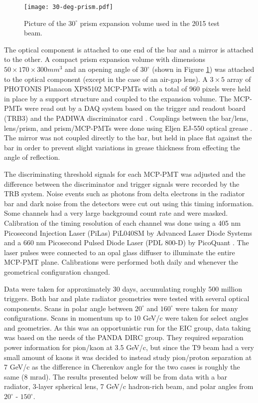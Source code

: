 \begin{figure}[!htb]
	\centering
	\texttt{[image: 30-deg-prism.pdf]}
	\caption{Picture of the $30^{\circ}$ prism expansion volume used in the 2015 test beam.}
	\label{fig:prototype_prism}
\end{figure}

The optical component is attached to one end of the bar and a mirror is attached to the other. A compact prism expansion volume with dimensions $50\times170\times300\unit{mm}^3$ and an opening angle of $30^\circ$ (shown in Figure \ref{fig:prototype_prism}) was attached to the optical component (except in the case of an air-gap lens). A $3\times5$ array of PHOTONIS Planacon XP85102 MCP-PMTs with a total of 960 pixels were held in place by a support structure and coupled to the expansion volume. The MCP-PMTs were read out by a DAQ system based on the trigger and readout board (TRB3) and the PADIWA discriminator card \cite{PANDA_electronics}. Couplings between the bar/lens, lens/prism, and prism/MCP-PMTs were done using Eljen EJ-550 optical grease \cite{EljenTech}. The mirror was not coupled directly to the bar, but held in place flat against the bar in order to prevent slight variations in grease thickness from effecting the angle of reflection.

The discriminating threshold signals for each MCP-PMT was adjusted and the difference between the discriminator and trigger signals were recorded by the TRB system. Noise events such as photons from delta electrons in the radiator bar and dark noise from the detectors were cut out using this timing information. Some channels had a very large background count rate and were masked. Calibration of the timing resolution of each channel was done using a 405 nm Picosecond Injection Laser (PiLas) PiL040SM by Advanced Laser Diode Systems \cite{PiLas} and a 660 nm Picosecond Pulsed Diode Laser (PDL 800-D) by PicoQuant \cite{PicoQuant}. The laser pulses were connected to an opal glass diffuser to illuminate the entire MCP-PMT plane. Calibrations were performed both daily and whenever the geometrical configuration changed.

Data were taken for approximately 30 days, accumulating roughly 500 million triggers. Both bar and plate radiator geometries were tested with several optical components. Scans in polar angle between $20^\circ$ and $160^\circ$ were taken for many configurations. Scans in momentum up to 10 GeV/c were taken for select angles and geometries. As this was an opportunistic run for the EIC group, data taking was based on the needs of the PANDA DIRC group. They required separation power information for pion/kaon at 3.5 GeV/c, but since the T9 beam had a very small amount of kaons it was decided to instead study pion/proton separation at 7 GeV/c as the difference in Cherenkov angle for the two cases is roughly the same (8 mrad). The results presented below will be from data with a bar radiator, 3-layer spherical lens, 7 GeV/c hadron-rich beam, and polar angles from  $20^\circ$ - $150^\circ$.

